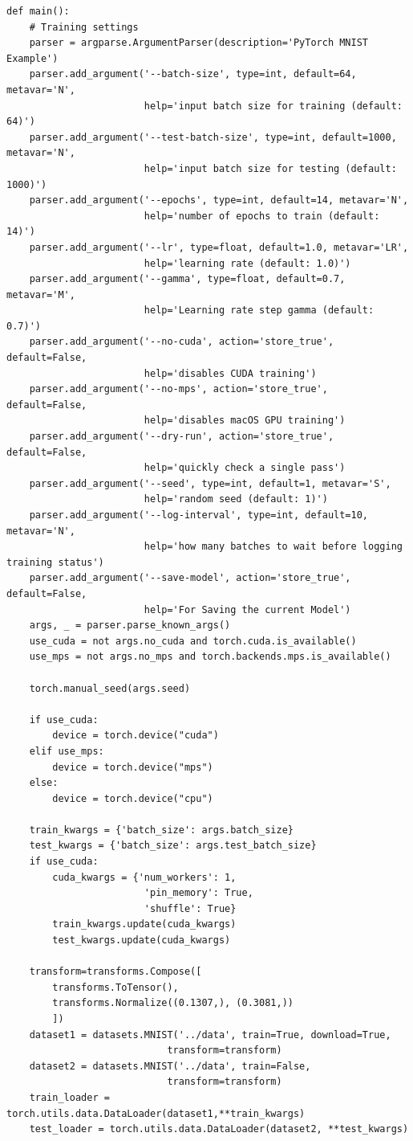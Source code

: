 \documentclass[letter]{article}
\theoremstyle{definition}
\begin{document}
\begin{verbatim}
def main():
    # Training settings
    parser = argparse.ArgumentParser(description='PyTorch MNIST Example')
    parser.add_argument('--batch-size', type=int, default=64, metavar='N',
                        help='input batch size for training (default: 64)')
    parser.add_argument('--test-batch-size', type=int, default=1000, metavar='N',
                        help='input batch size for testing (default: 1000)')
    parser.add_argument('--epochs', type=int, default=14, metavar='N',
                        help='number of epochs to train (default: 14)')
    parser.add_argument('--lr', type=float, default=1.0, metavar='LR',
                        help='learning rate (default: 1.0)')
    parser.add_argument('--gamma', type=float, default=0.7, metavar='M',
                        help='Learning rate step gamma (default: 0.7)')
    parser.add_argument('--no-cuda', action='store_true', default=False,
                        help='disables CUDA training')
    parser.add_argument('--no-mps', action='store_true', default=False,
                        help='disables macOS GPU training')
    parser.add_argument('--dry-run', action='store_true', default=False,
                        help='quickly check a single pass')
    parser.add_argument('--seed', type=int, default=1, metavar='S',
                        help='random seed (default: 1)')
    parser.add_argument('--log-interval', type=int, default=10, metavar='N',
                        help='how many batches to wait before logging training status')
    parser.add_argument('--save-model', action='store_true', default=False,
                        help='For Saving the current Model')
    args, _ = parser.parse_known_args()
    use_cuda = not args.no_cuda and torch.cuda.is_available()
    use_mps = not args.no_mps and torch.backends.mps.is_available()

    torch.manual_seed(args.seed)

    if use_cuda:
        device = torch.device("cuda")
    elif use_mps:
        device = torch.device("mps")
    else:
        device = torch.device("cpu")

    train_kwargs = {'batch_size': args.batch_size}
    test_kwargs = {'batch_size': args.test_batch_size}
    if use_cuda:
        cuda_kwargs = {'num_workers': 1,
                        'pin_memory': True,
                        'shuffle': True}
        train_kwargs.update(cuda_kwargs)
        test_kwargs.update(cuda_kwargs)

    transform=transforms.Compose([
        transforms.ToTensor(),
        transforms.Normalize((0.1307,), (0.3081,))
        ])
    dataset1 = datasets.MNIST('../data', train=True, download=True,
                            transform=transform)
    dataset2 = datasets.MNIST('../data', train=False,
                            transform=transform)
    train_loader = torch.utils.data.DataLoader(dataset1,**train_kwargs)
    test_loader = torch.utils.data.DataLoader(dataset2, **test_kwargs)


\end{verbatim}
\end{document}

